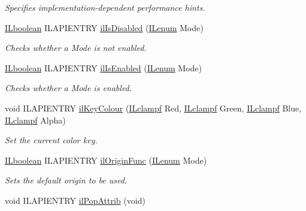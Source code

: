 \begin{DoxyCompactItemize}
\begin{DoxyCompactList}\small\item\em Specifies implementation-\/dependent performance hints. \end{DoxyCompactList}\item 
\hyperlink{group__il__types_gaa6aa7c95cfdc06b4d8601ef832b7bb0a}{I\+Lboolean} I\+L\+A\+P\+I\+E\+N\+T\+R\+Y \hyperlink{group__state_ga6fdd0b1ac89f9a43bdb3be9a23cbe354}{il\+Is\+Disabled} (\hyperlink{group__il__types_ga62ca73445716183ef42b1f3906a45ed0}{I\+Lenum} Mode)
\begin{DoxyCompactList}\small\item\em Checks whether a {\itshape Mode} is not enabled. \end{DoxyCompactList}\item 
\hyperlink{group__il__types_gaa6aa7c95cfdc06b4d8601ef832b7bb0a}{I\+Lboolean} I\+L\+A\+P\+I\+E\+N\+T\+R\+Y \hyperlink{group__state_ga8f2fb1299fd1cf25c2a959aa3837cc48}{il\+Is\+Enabled} (\hyperlink{group__il__types_ga62ca73445716183ef42b1f3906a45ed0}{I\+Lenum} Mode)
\begin{DoxyCompactList}\small\item\em Checks whether a {\itshape Mode} is enabled. \end{DoxyCompactList}\item 
\hypertarget{group__state_gaf3c1ed8cef65fe9816a3c00486d94fd2}{void I\+L\+A\+P\+I\+E\+N\+T\+R\+Y \hyperlink{group__state_gaf3c1ed8cef65fe9816a3c00486d94fd2}{il\+Key\+Colour} (\hyperlink{group__il__types_gae90d8075bf3ef2cd89c09b26fd4dbef2}{I\+Lclampf} Red, \hyperlink{group__il__types_gae90d8075bf3ef2cd89c09b26fd4dbef2}{I\+Lclampf} Green, \hyperlink{group__il__types_gae90d8075bf3ef2cd89c09b26fd4dbef2}{I\+Lclampf} Blue, \hyperlink{group__il__types_gae90d8075bf3ef2cd89c09b26fd4dbef2}{I\+Lclampf} Alpha)}\label{group__state_gaf3c1ed8cef65fe9816a3c00486d94fd2}

\begin{DoxyCompactList}\small\item\em Set the current color key. \end{DoxyCompactList}\item 
\hyperlink{group__il__types_gaa6aa7c95cfdc06b4d8601ef832b7bb0a}{I\+Lboolean} I\+L\+A\+P\+I\+E\+N\+T\+R\+Y \hyperlink{group__state_gab518656efaed3f7ca95857e367e62ccd}{il\+Origin\+Func} (\hyperlink{group__il__types_ga62ca73445716183ef42b1f3906a45ed0}{I\+Lenum} Mode)
\begin{DoxyCompactList}\small\item\em Sets the default origin to be used. \end{DoxyCompactList}\item 
\hypertarget{group__state_gacc9ee35a9e48b55880655f6d143f39c1}{void I\+L\+A\+P\+I\+E\+N\+T\+R\+Y \hyperlink{group__state_gacc9ee35a9e48b55880655f6d143f39c1}{il\+Pop\+Attrib} (void)}\label{group__state_gacc9ee35a9e48b55880655f6d143f39c1}


\end{DoxyCompactItemize}
